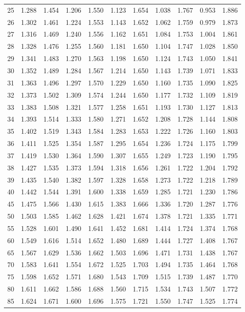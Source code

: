 \documentclass[12pt]{article}
\begin{document}
\begin{table}
\begin{center}
{\begin{tabular}{|c|c|c|c|c|c|c|c|c|c|c|}
	25&1.288&1.454&1.206&1.550&1.123&1.654&1.038&1.767&0.953&1.886\\
	26&1.302&1.461&1.224&1.553&1.143&1.652&1.062&1.759&0.979&1.873\\
	27&1.316&1.469&1.240&1.556&1.162&1.651&1.084&1.753&1.004&1.861\\
	28&1.328&1.476&1.255&1.560&1.181&1.650&1.104&1.747&1.028&1.850\\
	29&1.341&1.483&1.270&1.563&1.198&1.650&1.124&1.743&1.050&1.841\\
	30&1.352&1.489&1.284&1.567&1.214&1.650&1.143&1.739&1.071&1.833\\
	31&1.363&1.496&1.297&1.570&1.229&1.650&1.160&1.735&1.090&1.825\\
	32&1.373&1.502&1.309&1.574&1.244&1.650&1.177&1.732&1.109&1.819\\
	33&1.383&1.508&1.321&1.577&1.258&1.651&1.193&1.730&1.127&1.813\\
	34&1.393&1.514&1.333&1.580&1.271&1.652&1.208&1.728&1.144&1.808\\
	35&1.402&1.519&1.343&1.584&1.283&1.653&1.222&1.726&1.160&1.803\\
	36&1.411&1.525&1.354&1.587&1.295&1.654&1.236&1.724&1.175&1.799\\
	37&1.419&1.530&1.364&1.590&1.307&1.655&1.249&1.723&1.190&1.795\\
	38&1.427&1.535&1.373&1.594&1.318&1.656&1.261&1.722&1.204&1.792\\
	39&1.435&1.540&1.382&1.597&1.328&1.658&1.273&1.722&1.218&1.789\\
	40&1.442&1.544&1.391&1.600&1.338&1.659&1.285&1.721&1.230&1.786\\
	45&1.475&1.566&1.430&1.615&1.383&1.666&1.336&1.720&1.287&1.776\\
	50&1.503&1.585&1.462&1.628&1.421&1.674&1.378&1.721&1.335&1.771\\
	55&1.528&1.601&1.490&1.641&1.452&1.681&1.414&1.724&1.374&1.768\\
	60&1.549&1.616&1.514&1.652&1.480&1.689&1.444&1.727&1.408&1.767\\
	65&1.567&1.629&1.536&1.662&1.503&1.696&1.471&1.731&1.438&1.767\\
	70&1.583&1.641&1.554&1.672&1.525&1.703&1.494&1.735&1.464&1.768\\
	75&1.598&1.652&1.571&1.680&1.543&1.709&1.515&1.739&1.487&1.770\\
	80&1.611&1.662&1.586&1.688&1.560&1.715&1.534&1.743&1.507&1.772\\
	85&1.624&1.671&1.600&1.696&1.575&1.721&1.550&1.747&1.525&1.774\\

\end{tabular}}
\end{center}
\end{table}
\end{document}
